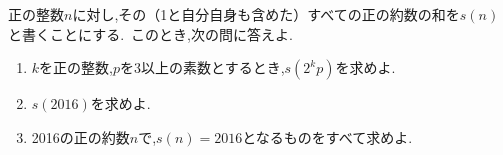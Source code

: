 \begin{problem}
正の整数$n$に対し,その（1と自分自身も含めた）すべての正の約数の和を$s(n)$と書くことにする.\, このとき,次の問に答えよ.
  \begin{enumerate}[(1)\ ]
    \item $k$を正の整数,$p$を3以上の素数とするとき,$s(2^kp)$を求めよ.
    \item $s(2016)$を求めよ.
    \item 2016の正の約数$n$で,$s(n)=2016$となるものをすべて求めよ.
  \end{enumerate}
\end{problem}
